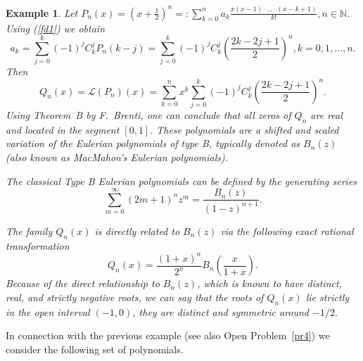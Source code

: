 \documentclass[12pt]{amsart}
\newcounter{count}
\numberwithin{count}{section}
\newtheorem{Example}[count]{Example}
\begin{document}
\begin{Example}
\label{ex2c} 
Let $P_n(x) =\left(x + \frac{1}{2}\right)^n =:
\sum_{k=0}^n a_k   \frac{x(x-1)\cdot \ldots \cdot (x-k+1)}{k!}, 
n\in \mathbb{N}.$ Using (\ref{fd1}) we obtain
$$ a_k=  \sum_{j=0}^k (-1)^j   C_k^j P_n(k-j) = \sum_{j=0}^k (-1)^j   C_k^j 
\left(\frac{2k-2j+1}{2}  \right)^n,  k= 0, 1,  \ldots, n.
 $$
 Then
 $$ Q_n(x)= \mathcal{L}(P_n)(x) = \sum_{k=0}^n x^k  \sum_{j=0}^k (-1)^j   C_k^j 
\left(\frac{2k-2j+1}{2}  \right)^n.$$
Using Theorem~B by F.~Brenti, one can conclude that all zeros of $Q_n$ are
real and located in the segment $[0, 1].$ These polynomials are a shifted and scaled 
variation of the Eulerian polynomials of type B, typically denoted as $B_n(z)$ (also
 known as MacMahon's Eulerian polynomials). 

The classical Type B Eulerian polynomials can be defined by the generating series
$$\sum_{m=0}^\infty (2m+1)^n z^m = \frac{B_n(z)}{(1-z)^{n+1}}.$$

The family $Q_n(x)$ is directly related to $B_n(z)$ via the following exact rational transformation
$$Q_n(x) = \frac{(1+x)^n}{2^n} B_n\left(\frac{x}{1+x}\right).$$
Because of the direct relationship to $B_n(z)$, which is known to have distinct, real, and strictly negative 
roots, we can say that the roots of $Q_n(x)$  lie strictly in the open interval $(-1, 0)$, they are distinct
and symmetric around $-1/2.$

\end{Example} 

In connection with the previous example (see also Open Problem~\ref{pr4})
we consider the following set of polynomials.
\end{document}
